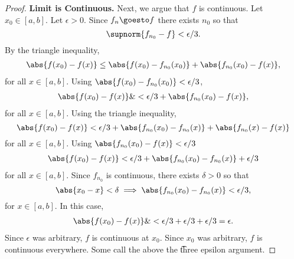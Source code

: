 \begin{proof}
\textbf{Limit is Continuous.}
Next, we argue that $f$ is continuous.
Let $x_0 \in [a, b]$.
Let $\epsilon  > 0$.
Since $f_n \goesto f$ there exists
$n_0$ so that
    \[
\supnorm{f_{n_0} - f} < \epsilon /3.
    \]
By the triangle inequality,
    \[
\begin{aligned}
\abs{f(x_0) - f(x)} \leq \abs{f(x_0) - f_{n_0}(x_0)} + \abs{f_{n_0}(x_0) - f(x)},
\end{aligned}
    \]
for all $x \in [a, b]$.
Using $\abs{f(x_0) - f_{n_0}(x_0)} < \epsilon /3$,
    \[
\begin{aligned}
\abs{f(x_0) - f(x)} \&< \epsilon /3 + \abs{f_{n_0}(x_0) - f(x)},
\end{aligned}
    \]
for all $x \in [a, b]$.
Using the triangle inequality,
    \[
\abs{f(x_0) - f(x)} < \epsilon /3 + \abs{f_{n_0}(x_0) - f_{n_0}(x)} + \abs{f_{n_0}(x) - f(x)} \\
    \]
for all $x \in [a, b]$.
Using $\abs{f_{n_0}(x_0) - f(x)} < \epsilon /3$
    \[
\begin{aligned}
\abs{f(x_0) - f(x)} < \epsilon /3 + \abs{f_{n_0}(x_0) - f_{n_0}(x)} + \epsilon /3 \\
\end{aligned}
    \]
for all $x \in [a, b]$.
Since $f_{n_0}$ is continuous, there exists $\delta  > 0$ so that
    \[
\abs{x_0 - x} < \delta
\implies
\abs{f_{n_0}(x_0) - f_{n_0}(x)} < \epsilon /3,
    \]
for $x \in [a, b]$.
In this case,
    \[
\begin{aligned}
\abs{f(x_0) - f(x)} \&< \epsilon /3 + \epsilon /3 + \epsilon /3 = \epsilon .
\end{aligned}
    \]
Since $\epsilon $ was arbitrary, $f$ is continuous at $x_0$.
Since $x_0$ was arbitrary, $f$ is continuous everywhere.
Some call the above the \t{three epsilon argument}.
\end{proof}